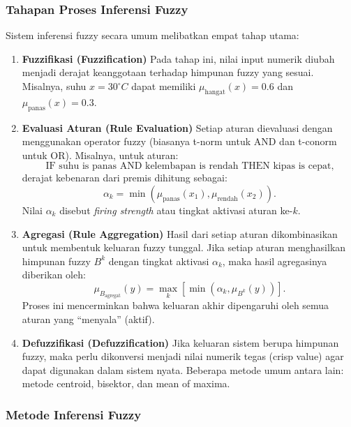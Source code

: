 \documentclass[12pt,a4paper]{article}
\theoremstyle{remark}
\begin{document}
\subsubsection{Tahapan Proses Inferensi Fuzzy}

Sistem inferensi fuzzy secara umum melibatkan empat tahap utama:

\begin{enumerate}
    \item \textbf{Fuzzifikasi (Fuzzification)}
          Pada tahap ini, nilai input numerik diubah menjadi derajat keanggotaan terhadap himpunan fuzzy yang sesuai.
          Misalnya, suhu \(x = 30^\circ C\) dapat memiliki \(\mu_{\text{hangat}}(x) = 0.6\) dan \(\mu_{\text{panas}}(x) = 0.3\).

    \item \textbf{Evaluasi Aturan (Rule Evaluation)}
          Setiap aturan dievaluasi dengan menggunakan operator fuzzy (biasanya t-norm untuk AND dan t-conorm untuk OR).
          Misalnya, untuk aturan:
          \[
              \text{IF suhu is panas AND kelembapan is rendah THEN kipas is cepat,}
          \]
          derajat kebenaran dari premis dihitung sebagai:
          \[
              \alpha_k = \min(\mu_{\text{panas}}(x_1), \mu_{\text{rendah}}(x_2)).
          \]
          Nilai \(\alpha_k\) disebut \textit{firing strength} atau tingkat aktivasi aturan ke-\(k\).

    \item \textbf{Agregasi (Rule Aggregation)}
          Hasil dari setiap aturan dikombinasikan untuk membentuk keluaran fuzzy tunggal. Jika setiap aturan menghasilkan himpunan fuzzy \(B^k\) dengan tingkat aktivasi \(\alpha_k\), maka hasil agregasinya diberikan oleh:
          \[
              \mu_{B_{\text{agregat}}}(y) = \max_k [ \min(\alpha_k, \mu_{B^k}(y)) ].
          \]
          Proses ini mencerminkan bahwa keluaran akhir dipengaruhi oleh semua aturan yang “menyala” (aktif).

    \item \textbf{Defuzzifikasi (Defuzzification)}
          Jika keluaran sistem berupa himpunan fuzzy, maka perlu dikonversi menjadi nilai numerik tegas (crisp value) agar dapat digunakan dalam sistem nyata.
          Beberapa metode umum antara lain: metode centroid, bisektor, dan mean of maxima.
\end{enumerate}

\subsubsection{Metode Inferensi Fuzzy}
\end{document}
